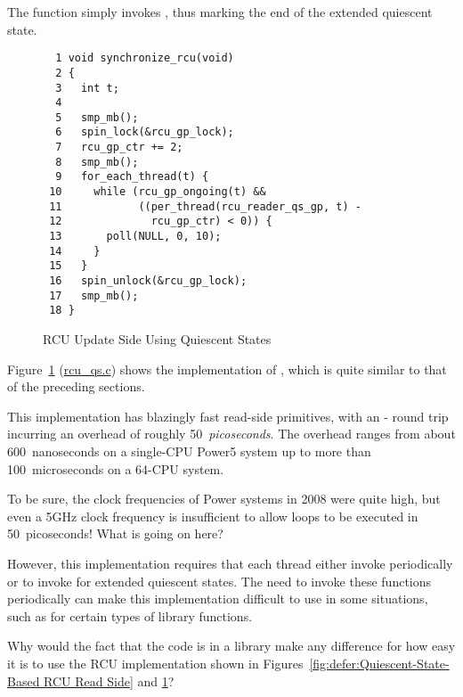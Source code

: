 The  function simply invokes
, thus marking the end of the extended
quiescent state.

\begin{figure}[tbp]
{ \scriptsize
\begin{verbatim}
  1 void synchronize_rcu(void)
  2 {
  3   int t;
  4
  5   smp_mb();
  6   spin_lock(&rcu_gp_lock);
  7   rcu_gp_ctr += 2;
  8   smp_mb();
  9   for_each_thread(t) {
 10     while (rcu_gp_ongoing(t) &&
 11            ((per_thread(rcu_reader_qs_gp, t) -
 12              rcu_gp_ctr) < 0)) {
 13       poll(NULL, 0, 10);
 14     }
 15   }
 16   spin_unlock(&rcu_gp_lock);
 17   smp_mb();
 18 }
\end{verbatim}
}
\caption{RCU Update Side Using Quiescent States}
\label{fig:defer:RCU Update Side Using Quiescent States}
\end{figure}

Figure~\ref{fig:defer:RCU Update Side Using Quiescent States}
(\url{rcu_qs.c})
shows the implementation of , which is
quite similar to that of the preceding sections.

This implementation has blazingly fast read-side primitives, with
an - round trip incurring
an overhead of roughly 50~\emph{picoseconds}.
The  overhead ranges from about 600~nanoseconds
on a single-CPU Power5 system up to more than 100~microseconds on
a 64-CPU system.

\QuickQuiz{}
	To be sure, the clock frequencies of Power
	systems in 2008 were quite high, but even a 5GHz clock
	frequency is insufficient to allow
	loops to be executed in 50~picoseconds!
	What is going on here?
 \QuickQuizEnd

However, this implementation requires that each thread either
invoke  periodically or to invoke
 for extended quiescent states.
The need to invoke these functions periodically can make this
implementation difficult to use in some situations, such as for
certain types of library functions.

\QuickQuiz{}
	Why would the fact that the code is in a library make
	any difference for how easy it is to use the RCU
	implementation shown in
	Figures~\ref{fig:defer:Quiescent-State-Based RCU Read Side} and
	\ref{fig:defer:RCU Update Side Using Quiescent States}?
 \QuickQuizEnd

